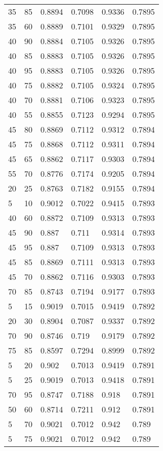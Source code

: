 \begin{center}
\begin{longtable}{|l|l|l|l|l|l|}
35 & 85 & 0.8894 & 0.7098 & 0.9336 & 0.7895 \\
35 & 60 & 0.8889 & 0.7101 & 0.9329 & 0.7895 \\
40 & 90 & 0.8884 & 0.7105 & 0.9326 & 0.7895 \\
40 & 85 & 0.8883 & 0.7105 & 0.9326 & 0.7895 \\
40 & 95 & 0.8883 & 0.7105 & 0.9326 & 0.7895 \\
40 & 75 & 0.8882 & 0.7105 & 0.9324 & 0.7895 \\
40 & 70 & 0.8881 & 0.7106 & 0.9323 & 0.7895 \\
40 & 55 & 0.8855 & 0.7123 & 0.9294 & 0.7895 \\
45 & 80 & 0.8869 & 0.7112 & 0.9312 & 0.7894 \\
45 & 75 & 0.8868 & 0.7112 & 0.9311 & 0.7894 \\
45 & 65 & 0.8862 & 0.7117 & 0.9303 & 0.7894 \\
55 & 70 & 0.8776 & 0.7174 & 0.9205 & 0.7894 \\
20 & 25 & 0.8763 & 0.7182 & 0.9155 & 0.7894 \\
5  & 10 & 0.9012 & 0.7022 & 0.9415 & 0.7893 \\
40 & 60 & 0.8872 & 0.7109 & 0.9313 & 0.7893 \\
45 & 90 & 0.887  & 0.711  & 0.9314 & 0.7893 \\
45 & 95 & 0.887  & 0.7109 & 0.9313 & 0.7893 \\
45 & 85 & 0.8869 & 0.7111 & 0.9313 & 0.7893 \\
45 & 70 & 0.8862 & 0.7116 & 0.9303 & 0.7893 \\
70 & 85 & 0.8743 & 0.7194 & 0.9177 & 0.7893 \\
5  & 15 & 0.9019 & 0.7015 & 0.9419 & 0.7892 \\
20 & 30 & 0.8904 & 0.7087 & 0.9337 & 0.7892 \\
70 & 90 & 0.8746 & 0.719  & 0.9179 & 0.7892 \\
75 & 85 & 0.8597 & 0.7294 & 0.8999 & 0.7892 \\
5  & 20 & 0.902  & 0.7013 & 0.9419 & 0.7891 \\
5  & 25 & 0.9019 & 0.7013 & 0.9418 & 0.7891 \\
70 & 95 & 0.8747 & 0.7188 & 0.918  & 0.7891 \\
50 & 60 & 0.8714 & 0.7211 & 0.912  & 0.7891 \\
5  & 70 & 0.9021 & 0.7012 & 0.942  & 0.789  \\
5  & 75 & 0.9021 & 0.7012 & 0.942  & 0.789  \\

\end{longtable}
\end{center}
